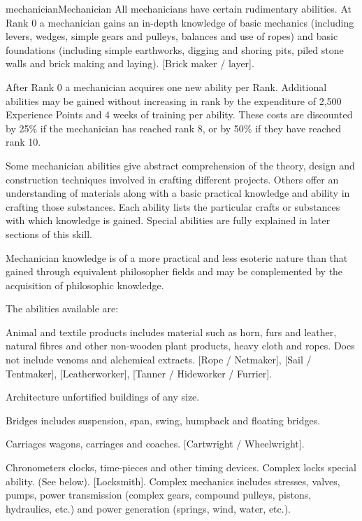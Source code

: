 \begin{Skill}[2.2]{mechanician}{Mechanician}
All mechanicians have certain rudimentary abilities.  At Rank 0 a
mechanician gains an in-depth knowledge of basic mechanics (including
levers, wedges, simple gears and pulleys, balances and use of ropes)
and basic foundations (including simple earthworks, digging and
shoring pits, piled stone walls and brick making and laying).  [Brick
  maker / layer].

After Rank 0 a mechanician acquires one new ability per Rank.
Additional abilities may be gained without increasing in rank by the
expenditure of 2,500 Experience Points and 4 weeks of training per
ability.  These costs are discounted by 25\% if the mechanician has
reached rank 8, or by 50\% if they have reached rank 10.

Some mechanician abilities give abstract comprehension of the theory,
design and construction techniques involved in crafting different
projects.  Others offer an understanding of materials along with a
basic practical knowledge and ability in crafting those substances.
Each ability lists the particular crafts or substances with which
knowledge is gained. Special abilities are fully explained in later
sections of this skill.

Mechanician knowledge is of a more practical and less esoteric nature
than that gained through equivalent philosopher fields and may be
complemented by the acquisition of philosophic knowledge.

The abilities available are: 

\begin{Description}
  
\item[Animal] and textile products includes material such as horn,
  furs and leather, natural fibres and other non-wooden plant
  products, heavy cloth and ropes.  Does not include venoms and
  alchemical extracts.  [Rope / Netmaker], [Sail / Tentmaker],
  [Leatherworker], [Tanner / Hideworker / Furrier].

\item[Architecture] unfortified buildings of any size.

\item[Bridges]  includes  suspension,  span,  swing,  humpback and floating bridges. 

\item[Carriages] wagons, carriages and coaches.  [Cartwright /
  Wheelwright].

\item[Chronometers] clocks, time-pieces and other timing devices.
  Complex locks special ability.  (See below). [Locksmith]. Complex
  mechanics includes stresses, valves, pumps, power transmission
  (complex gears, compound pulleys, pistons, hydraulics, etc.)  and
  power generation (springs, wind, water, etc.).


\end{Description}
\end{Skill}

